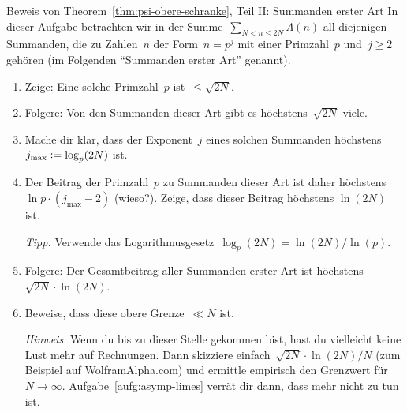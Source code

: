 \documentclass[twoside]{../zirkelblatt1415}
\theoremstyle{definition}
\theoremstyle{plain}
\theoremstyle{remark}
\newcommand{\defeq}{\vcentcolon=}
\begin{document}
\begin{aufgabe}{Beweis von Theorem~\ref{thm:psi-obere-schranke}, Teil II:
Summanden erster Art}
In dieser Aufgabe betrachten wir in der Summe~$\sum_{N < n \leq 2N} \Lambda(n)$
all diejenigen Summanden, die zu Zahlen~$n$ der Form~$n = p^j$ mit einer Primzahl~$p$
und~$j \geq 2$ gehören (im Folgenden "`Summanden erster Art"' genannt).
\begin{enumerate}
\item Zeige: Eine solche Primzahl~$p$ ist~$\leq \sqrt{2N}$.
\item Folgere: Von den Summanden dieser Art gibt es höchstens~$\sqrt{2N}$ viele.
\item Mache dir klar, dass der Exponent~$j$ eines solchen Summanden
höchstens~$j_\text{max} \defeq \log_p(2N)$ ist.
\item Der Beitrag der Primzahl~$p$ zu Summanden dieser Art ist daher höchstens
$\ln p \cdot (j_\text{max}-2)$ (wieso?). Zeige, dass dieser
Beitrag höchstens $\ln(2N)$ ist.

\emph{Tipp.} Verwende das Logarithmusgesetz~$\log_p(2N) = \ln(2N)/\ln(p)$.
\item Folgere: Der Gesamtbeitrag aller Summanden erster Art ist höchstens
$\sqrt{2N} \cdot \ln(2N)$.
\item Beweise, dass diese obere Grenze~$\ll N$ ist.

\emph{Hinweis.} Wenn du bis zu dieser Stelle gekommen bist, hast du vielleicht
keine Lust mehr auf Rechnungen. Dann skizziere einfach~$\sqrt{2N} \cdot \ln(2N)
/ N$ (zum Beispiel auf WolframAlpha.com) und ermittle empirisch
den Grenzwert für~$N \to \infty$. Aufgabe~\ref{aufg:asymp-limes} verrät dir
dann, dass mehr nicht zu tun ist.
\end{enumerate}\fixlistspacing
\end{aufgabe}
\end{document}
